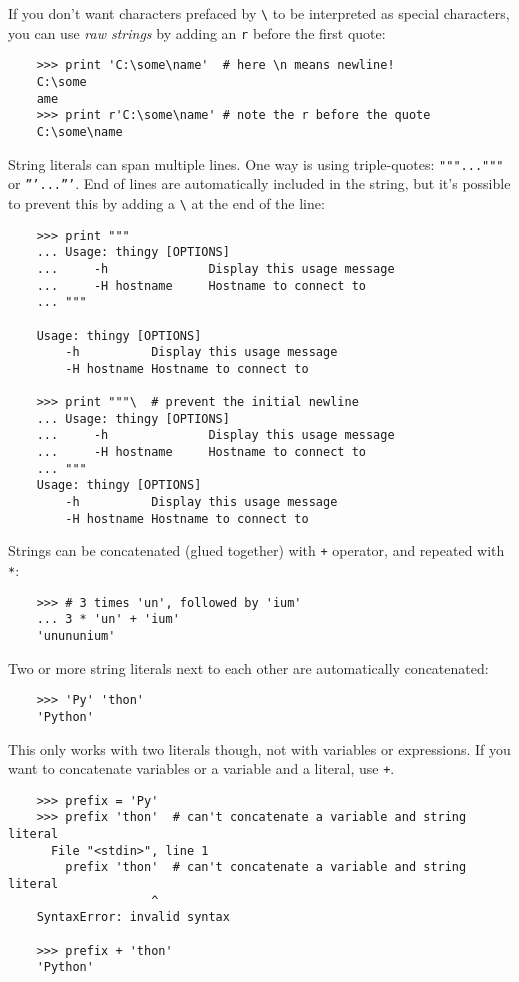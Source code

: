 \documentclass[UTF8]{article}
\begin{document}
If you don't want characters prefaced by \texttt{\textbackslash} to be interpreted as special
characters, you can use \emph{raw strings} by adding an \texttt{r} before the first quote:
\begin{verbatim}
    >>> print 'C:\some\name'  # here \n means newline!
    C:\some
    ame
    >>> print r'C:\some\name' # note the r before the quote
    C:\some\name
\end{verbatim}

String literals can span multiple lines. One way is using triple-quotes: \texttt{"""..."""} or
\texttt{'''...'''}. End of lines are automatically included in the string, but it's possible to
prevent this by adding a \texttt{\textbackslash} at the end of the line:
\begin{verbatim}
    >>> print """
    ... Usage: thingy [OPTIONS]
    ...     -h              Display this usage message
    ...     -H hostname     Hostname to connect to
    ... """

    Usage: thingy [OPTIONS]
        -h          Display this usage message
        -H hostname Hostname to connect to

    >>> print """\  # prevent the initial newline
    ... Usage: thingy [OPTIONS]
    ...     -h              Display this usage message
    ...     -H hostname     Hostname to connect to
    ... """
    Usage: thingy [OPTIONS]
        -h          Display this usage message
        -H hostname Hostname to connect to

\end{verbatim}

Strings can be concatenated (glued together) with \texttt{+} operator, and repeated with \texttt{*}:
\begin{verbatim}
    >>> # 3 times 'un', followed by 'ium'
    ... 3 * 'un' + 'ium'
    'unununium'
\end{verbatim}

Two or more string literals next to each other are automatically concatenated:
\begin{verbatim}
    >>> 'Py' 'thon'
    'Python'
\end{verbatim}

This only works with two literals though, not with variables or expressions. If you want to
concatenate variables or a variable and a literal, use \texttt{+}.
\begin{verbatim}
    >>> prefix = 'Py'
    >>> prefix 'thon'  # can't concatenate a variable and string literal
      File "<stdin>", line 1
        prefix 'thon'  # can't concatenate a variable and string literal
                    ^
    SyntaxError: invalid syntax

    >>> prefix + 'thon'
    'Python'
\end{verbatim}
\end{document}

